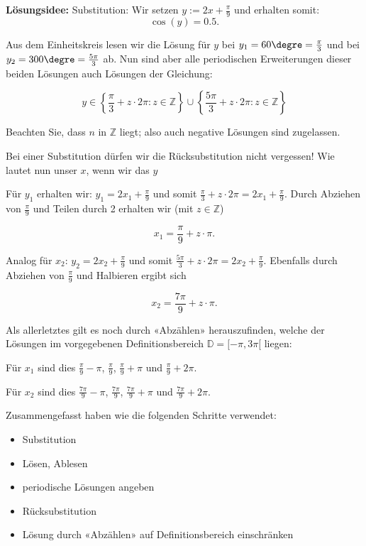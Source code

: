 \textbf{Lösungsidee:} Substitution:
Wir setzen $y := 2x + \frac{\pi}{9}$ und erhalten somit:
$$\cos(y) = 0.5.$$

Aus dem Einheitskreis lesen wir die Lösung für $y$ bei $y_1=60\degre = \frac{\pi}{3}$ und bei $y_2=300\degre = \frac{5\pi}{3}$ ab. Nun sind aber alle periodischen Erweiterungen dieser beiden Lösungen auch Lösungen der Gleichung:

$$y \in \left\{\frac{\pi}{3} + z\cdot{}2\pi: z\in\mathbb{Z}\right\} \cup \left\{\frac{5\pi}{3}+ z\cdot{}2\pi: z\in\mathbb{Z}\right\}$$

Beachten Sie, dass $n$ in $\mathbb{Z}$ liegt; also auch negative Lösungen sind zugelassen.

Bei einer Substitution dürfen wir die Rücksubstitution nicht vergessen! Wie lautet nun unser $x$, wenn wir das $y$ 

Für $y_1$ erhalten wir: $y_1= 2x_1 + \frac{\pi}{9}$ und somit $\frac{\pi}{3} + z\cdot{}2\pi = 2x_1 + \frac{\pi}{9}$. Durch Abziehen von $\frac{\pi}{9}$ und Teilen durch 2 erhalten wir (mit $z\in\mathbb{Z}$)

$$x_1 = \frac{\pi}{9} + z\cdot{}\pi.$$

Analog für $x_2$: $y_2 = 2x_2 + \frac{\pi}{9}$ und somit $\frac{5\pi}{3} + z\cdot{}2\pi = 2x_2 + \frac{\pi}{9}$. Ebenfalls durch Abziehen von $\frac{\pi}{9}$ und Halbieren ergibt sich

$$x_2 = \frac{7\pi}{9} + z\cdot{}\pi.$$

Als allerletztes gilt es noch durch «Abzählen» herauszufinden, welche der Lösungen im vorgegebenen Definitionsbereich $\mathbb{D} = [-\pi, 3\pi[$ liegen:

    Für $x_1$ sind dies $\frac{\pi}{9} - \pi$, $\frac{\pi}{9}$, $\frac{\pi}{9} + \pi$ und $\frac{\pi}{9} + 2\pi$.

    Für $x_2$ sind dies $\frac{7\pi}{9} - \pi$, $\frac{7\pi}{9}$, $\frac{7\pi}{9} + \pi$ und $\frac{7\pi}{9} + 2\pi$.
   
    Zusammengefasst haben wie die folgenden Schritte verwendet:
    \begin{rezept}{}{}
\begin{itemize}
    \item Substitution
    \item Lösen, Ablesen
    \item periodische Lösungen angeben
    \item Rücksubstitution
    \item Lösung durch «Abzählen» auf Definitionsbereich einschränken
\end{itemize}
\end{rezept}%
\newpage



